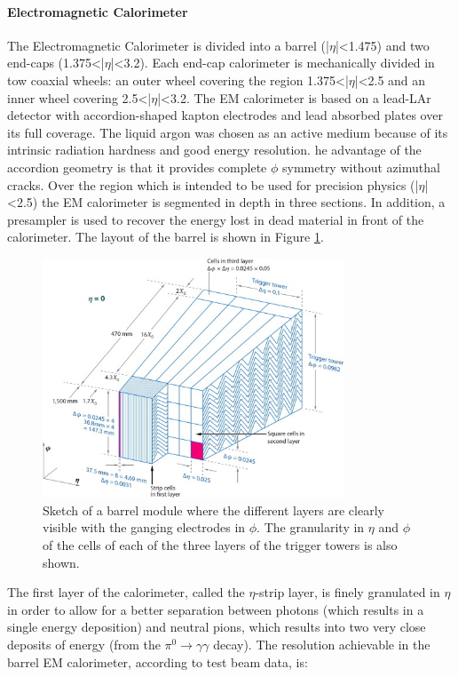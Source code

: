 \paragraph{Electromagnetic Calorimeter}

The Electromagnetic Calorimeter is divided into a barrel (|$\eta$|<1.475) and two end-caps (1.375<|$\eta$|<3.2). Each end-cap calorimeter is mechanically divided in tow coaxial wheels: an outer wheel covering the region 1.375<|$\eta$|<2.5 and an inner wheel covering 2.5<|$\eta$|<3.2. The EM calorimeter is based on a lead-LAr detector with accordion-shaped kapton electrodes and lead absorbed plates over its full coverage. The liquid argon was chosen as an active medium because of its intrinsic radiation hardness and good energy resolution. he advantage of the accordion geometry is that it provides complete $\phi$ symmetry without azimuthal cracks.
Over the region which is intended to be used for precision physics (|$\eta$|<2.5) the EM calorimeter is segmented in depth in three sections. In addition, a presampler is used to recover the energy lost in dead material in front of the calorimeter. The layout of the barrel is shown in Figure \ref{pic:emcalo}.

\begin{figure}
\center
\includegraphics[width=0.8\textwidth]{Images/atlas/EMCALO.jpg}
\caption{Sketch of a barrel module where the different layers are clearly visible with the ganging electrodes in $\phi$. The granularity in $\eta$ and $\phi$ of the cells of each of the three layers of the trigger towers is also shown.}
\label{pic:emcalo}
\end{figure}

The first layer of the calorimeter, called the $\eta$-strip layer, is finely granulated in $\eta$ in order to allow for a better separation between photons (which results in a single energy deposition) and neutral pions, which results into two very close deposits of energy (from the $\pi^0\rightarrow \gamma \gamma$ decay). The resolution achievable in the barrel EM calorimeter, according to test beam data, is:

